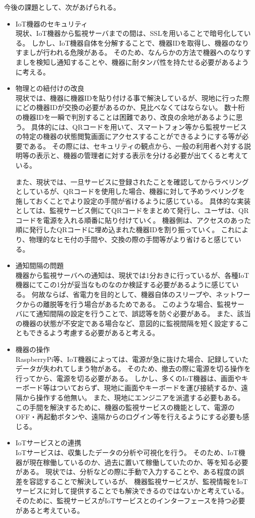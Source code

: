 

今後の課題として、次があげられる。
\begin{itemize}
\item IoT機器のセキュリティ\\
	現状、IoT機器から監視サーバまでの間は、SSLを用いることで暗号化している。
	しかし、IoT機器自体を分解することで、機器IDを取得し、機器のなりすましが行われる危険がある。
	そのため、なんらかの方法で機器へのなりすましを検知し通知することや、機器に耐タンパ性を持たせる必要があるように考える。
\item 物理との紐付けの改良\\
	現状では、機器に機器IDを貼り付ける事で解決しているが、現地に行った際にどの機器IDが交換の必要があるのか、見比べなくてはならない。
	数十桁の機器IDを一瞬で判別することは困難であり、改良の余地があるように思う。
	具体的には、QRコードを用いて、スマートフォン等から監視サービスの特定の機器の状態閲覧画面にアクセスすることができるようにする等が必要である。
	その際には、セキュリティの観点から、一般の利用者へ対する説明等の表示と、機器の管理者に対する表示を分ける必要が出てくると考えている。

	また、現状では、一旦サービスに登録されたことを確認してからラベリングとしているが、QRコードを使用した場合、機器に対して予めラベリングを施しておくことでより設定の手間が省けるように感じている。
	具体的な実装としては、監視サービス側にてQRコードをまとめて発行し、ユーザは、QRコードを電源を入れる順番に貼り付けていく。
	機器側は、アクセスのあった順に発行したQRコードに埋め込まれた機器IDを割り振っていく。
	これにより、物理的なヒモ付の手間や、交換の際の手間等がより省けると感じている。
\item  通知間隔の問題\\
	機器から監視サーバへの通知は、現状では1分おきに行っているが、各種IoT機器にてこの1分が妥当なものなのか検証する必要があるように感じている。
	何故ならば、省電力を目的として、機器自体のスリープや、ネットワークからの離脱等を行う場合があるためである。
	このような場合、監視サーバにて通知間隔の設定を行うことで、誤認等を防ぐ必要がある。
	また、該当の機器の状態が不安定である場合など、意図的に監視間隔を短く設定することもできるよう考慮する必要があると考える。
\item 機器の操作\\
	RaspberryPi等、IoT機器によっては、電源が急に抜けた場合、記録していたデータが失われてしまう物がある。
	そのため、撤去の際に電源を切る操作を行ってから、電源を切る必要がある。
	しかし、多くのIoT機器は、画面やキーボード等はついておらず、現地に画面やキーボードを運び接続するか、遠隔から操作する他無い。
	また、現地にエンジニアを派遣する必要もある。
	この手間を解決するために、機器の監視サービスの機能として、電源のOFF・再起動ボタンや、遠隔からのログイン等を行えるようにする必要も感じる。
\item IoTサービスとの連携\\
	IoTサービスは、収集したデータの分析や可視化を行う。
	そのため、IoT機器が現在稼働しているのか、過去に置いて稼働していたのか、等を知る必要がある。
	現状では、分析などの際に手動で入力することや、ある程度の誤差を容認することで解決しているが、
	機器監視サービスが、監視情報をIoTサービスに対して提供することでも解決できるのではないかと考えている。
	そのために、監視サービスがIoTサービスとのインターフェースを持つ必要があると考えている。
\end{itemize}
